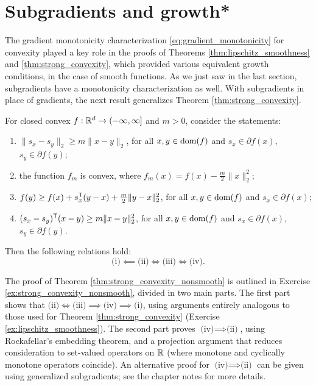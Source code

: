 \section{Subgradients and growth*}

The gradient monotonicity characterization \eqref{eq:gradient_monotonicity} for
convexity played a key role in the proofs of Theorems
\ref{thm:lipschitz_smoothness} and \ref{thm:strong_convexity}, which provided 
various equivalent growth conditions, in the case of smooth functions. As we
just saw in the last section, subgradients have a monotonicity characterization
as well. With subgradients in place of gradients, the next result generalizes
Theorem \ref{thm:strong_convexity}.      

\begin{Theorem}
\label{thm:strong_convexity_nonsmooth}
For closed convex $f : \mathbb{R}^d \to (-\infty, \infty]$ and $m>0$, consider the
statements:     
\begin{enumerate}[label=(\roman*)]
\item $\|s_x - s_y\|_2 \geq m \|x-y\|_2$, for all $x,y \in \operatorname{dom}(f)$ and 
  $s_x \in \partial f(x)$, $s_y \in \partial f(y)$;  
\item the function $f_m$ is convex, where $f_m(x) = f(x) - \frac{m}{2}
  \|x\|_2^2$;    
\item $f(y) \geq f(x) + s_x^{\mathsf{T}} (y-x) + \frac{m}{2} \|y-x\|_2^2$, for all $x,y
  \in \operatorname{dom}(f)$ and $s_x \in \partial f(x)$; 
\item $(s_x - s_y)^{\mathsf{T}} (x - y) \geq m\|x-y\|_2^2$, for all $x,y \in \operatorname{dom}(f)$ and
  $s_x \in \partial f(x)$, $s_y \in \partial f(y)$.  
\end{enumerate}
Then the following relations hold: 
\[
\text{(i)} \impliedby \text{(ii)} \iff \text{(iii)} \iff \text{(iv)}.
\]
\end{Theorem}

The proof of Theorem \ref{thm:strong_convexity_nonsmooth} is outlined in
Exercise \ref{ex:strong_convexity_nonsmooth}, divided in two main parts. The
first part shows that $\text{(ii)} \iff \text{(iii)} \implies \text{(iv)}
\implies \text{(i)}$, using arguments entirely analogous to those used for
Theorem \ref{thm:strong_convexity} (Exercise \ref{ex:lipschitz_smoothness}). The
second part proves $\text{(iv)} \implies \text{(ii)}$, using Rockafellar's
embedding theorem, and a projection argument that reduces consideration to
set-valued operators on $\mathbb{R}$ (where monotone and cyclically monotone operators
coincide). An alternative proof for $\text{(iv)} \implies \text{(ii)}$ can be
given using generalized subgradients; see the chapter notes for more details.

